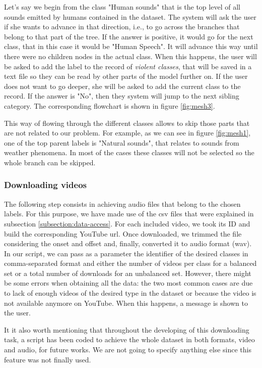 	
	Let's say we begin from the class "Human sounds" that is the top level of all sounds emitted by humans contained in the dataset. The system will ask the user if she wants to advance in that direction, i.e., to go across the branches that belong to that part of the tree. If the answer is positive, it would go for the next class, that in this case it would be "Human Speech". It will advance this way until there were no children nodes in the actual class. When this happens, the user will be asked to add the label to the record of \textit{violent classes}, that will be saved in a text file so they can be read by other parts of the model further on. If the user does not want to go deeper, she will be asked to add the current class to the record. If the answer is "No", then they system will jump to the next sibling category. The corresponding flowchart is shown in figure \ref{fig:mesh3}.
	
	This way of flowing through the different classes allows to skip those parts that are not related to our problem. For example, as we can see in figure \ref{fig:mesh1}, one of the top parent labels is "Natural sounds", that relates to sounds from weather phenomena. In most of the cases these classes will not be selected so the whole branch can be skipped. 
	
\subsubsection{Downloading videos}

	The following step consists in achieving audio files that belong to the chosen labels. For this purpose, we have made use of the \acrshort{csv} files that were explained in subsection \ref{subsection:data-access}. For each included video, we took its ID and build the corresponding YouTube \acrshort{url}. Once downloaded, we trimmed the file considering the onset and offset and, finally, converted it to audio format (\acrshort{wav}). In our script, we can pass as a parameter the identifier of the desired classes in comma-separated format and either the number of videos per class for a balanced set or a total number of downloads for an unbalanced set. However, there might be some errors when obtaining all the data: the two most common cases are due to lack of enough videos of the desired type in the dataset or because the video is not available anymore on YouTube. When this happens, a message is shown to the user.
	
	It it also worth mentioning that throughout the developing of this downloading task, a script has been coded to achieve the whole dataset in both formats, video and audio, for future works. We are not going to specify anything else since this feature was not finally used.
	
